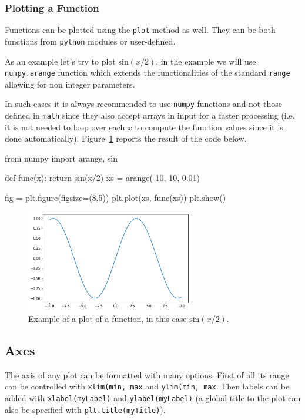 \subsubsection{Plotting a Function}\label{plotting-a-function}

Functions can be plotted using the \texttt{plot} method as well. They can be both functions from \texttt{python} modules or user-defined.

As an example let's try to plot $\mathrm{sin}(x/2)$, in the example we will use \texttt{numpy.arange} function which extends the functionalities of the standard \texttt{range} allowing for non integer parameters.

In such cases it is always recommended to use \texttt{numpy} functions and not those defined in \texttt{math} since they also accept arrays in input for a faster processing (i.e. it is not needed to loop over each $x$ to compute the function values since it is done automatically).
Figure~\ref{fig:sinx_x} reports the result of the code below.

\begin{ipythonnon}
from numpy import arange, sin

def func(x):
    return sin(x/2)
xs = arange(-10, 10, 0.01)

fig = plt.figure(figsize=(8,5))
plt.plot(xs, func(xs))
plt.show()
\end{ipythonnon}

\begin{figure}[htb]
	\centering
	\includegraphics[width=0.65\textwidth]{figures/sinx_x}
	\caption{Example of a plot of a function, in this case \(\mathrm{sin}(x/2)\).}
	\label{fig:sinx_x}
\end{figure}

\subsection{Axes}\label{axes}

The axis of any plot can be formatted with many options.
First of all its range can be controlled with \texttt{xlim(min, max} and \texttt{ylim(min, max}. Then labels can be added with \texttt{xlabel(myLabel)} and \texttt{ylabel(myLabel)} (a global title to the plot can also be specified with \texttt{plt.title(myTitle)}).

